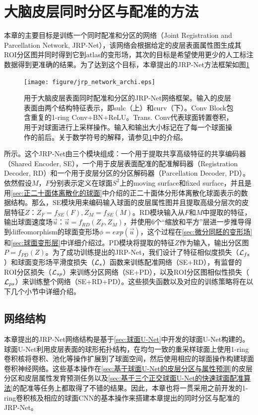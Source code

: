 \section{大脑皮层同时分区与配准的方法}\label{sec:大脑皮层同时分区与配准的网络结构}
本章的主要目标是训练一个同时配准和分区的网络（Joint Registration and Parcellation Network, JRP-Net），该网络会根据给定的皮层表面属性图生成其ROI分区图并同时得到它到atlas的变形场，其次的目标是希望使用更少的人工标注数据得到更准确的结果。为了达到这个目标，本章提出的JRP-Net方法框架如图\ref{fig:jrp_network_archi}
\begin{figure}[h]
	\centering
	\texttt{[image: figure/jrp\_network\_archi.eps]}
	\caption{用于大脑皮层表面同时配准和分区的JRP-Net网络框架。输入的皮层表面由两个结构特征表示，即sulc（上）和curv（下）。Conv Block包含重复的1-ring Conv+BN+ReLU。Trans. Conv代表球面转置卷积，用于对球面进行上采样操作。输入和输出大小标记在了每一个球面操作的前后。关于数学符号的解释，请参见\ref{sec:大脑皮层同时分区与配准的网络结构}中的介绍。}\label{fig:jrp_network_archi}
\end{figure}
所示。这个JRP-Net由三个模块组成：一个用于提取共享高级特征的共享编码器（Shared Encoder, SE），一个用于皮层表面配准的配准解码器（Registration Decoder, RD）和一个用于皮层分区的分区解码器（Parcellation Decoder, PD）。依然假设$M$，$F$分别表示定义在球面$S^2$上的moving surface和fixed surface，并且是用\ref{sec:正二十面体离散化的球面}中介绍的正二十面体分形体离散化球面表示的数据结构\cite{fischl2012freesurfer}。那么，SE模块用来编码输入球面的皮层属性图并且提取高级分层次的皮层特征$Z$：$Z_F=f_{SE}(F), Z_M=f_{SE}(M)$。RD模块输入从$F$和$M$中提取的特征，输出球面速度场$\overrightarrow{u}$：$\overrightarrow{u}=f_{RD}(Z_F,Z_M)$，并使用6个“缩放和平方”层进一步推导得到diffeomorphism的球面变形场$\phi=exp(\overrightarrow{u})$，这个过程在\ref{sec:微分同胚的变形场}和\ref{sec:球面变形层}中详细介绍过。PD模块将提取的特征$Z$作为输入，输出分区图$P=f_{PD}(Z)$。为了成功训练提出的JRP-Net，我们设计了特征相似度损失（${\cal L}_{fs}$）和球面变形场平滑度损失（${\cal L}_s$）函数来训练配准网络（SE+RD），有监督的ROI分区损失（${\cal L}_{sp}$）来训练分区网络（SE+PD），以及ROI分区图相似性损失（${\cal L}_{ps}$）来训练整个网络（SE+RD+PD）。这些损失函数以及对应的训练策略将在以下几个小节中详细介绍。

\subsection{网络结构}\label{sec:大脑皮层同时分区与配准的网络结构2.1}
本章提出的JRP-Net网络结构是基于\ref{sec:球面U-Net}中开发的球面U-Net构建的。球面U-Net利用皮层表面的球形拓扑结构，在均匀一致的重采样球面上使用1-ring卷积核将卷积、池化等操作扩展到了球面空间，然后使用相应的球面操作构建球面卷积神经网络。这些基本操作在\ref{sec:基于球面U-Net的皮层分区与属性预测}的皮层分区和皮层属性发育预测任务以及\ref{sec:基于三个正交球面U-Net的快速球面配准算法}的配准等任务上都取得了不错的结果。因此，本章也将一贯采用之前开发的1-ring卷积核及相应的球面CNN的基本操作来搭建本章提出的同时分区与配准的JRP-Net。

